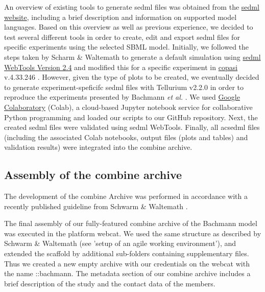An overview of existing tools to generate \ac{sedml} files was obtained from the \hyperlink{http://sed-ml.org/}{\acs{sedml} website}, including a brief description and information on supported model languages. Based on this overview as well as previous experience, we decided to test several different tools in order to create, edit and export \ac{sedml} files for specific experiments using the selected SBML model. 
Initially, we followed the steps taken by Scharm \& Waltemath \cite{combine} to generate a default simulation using \hyperlink{http://sysbioapps.spdns.org/SED-ML_Web_Tools}{\acs{sedml} WebTools Version 2.4} and modified this for a specific experiment in \hyperlink{http://copasi.org/}{\ac{copasi}} v.4.33.246 \cite{copasi}. However, given the type of plots to be created, we eventually decided to generate experiment-speficifc \ac{sedml} files with Tellurium v2.2.0 \cite{tellurium} in order to reproduce the experiments presented by Bachmann \textit{et al.} \cite{bachmannmodel}. We used \hyperref[https://colab.research.google.com/notebooks/welcome.ipynb?hl=de]{Google Colaboratory} (Colab), a cloud-based Jupyter notebook service for collaborative Python programming and loaded our scripts to our GitHub repository. Next, the created \ac{sedml} files were validated using \ac{sedml} WebTools. Finally, all ac{sedml} files (including the associated Colab notebooks, output files (plots and tables) and validation results) were integrated into the \ac{combine} archive.

\subsection*{Assembly of the \acs{combine} archive}

The development of the \ac{combine} Archive was performed in accordance with a recently published guideline from Schwarm \& Waltemath \cite{combine}.

The final assembly of our fully-featured \ac{combine} archive of the Bachmann model was executed in the platform \ac{webcat}. We used the same structure as described by Schwarm \& Waltemath (see 'setup of an agile working environment'), and extended the scaffold by additional sub-folders containing supplementary files. Thus we created a new empty archive with our credentials on the \ac{webcat} with the name \textsf{::bachmann}. The metadata section of our \ac{combine} archive includes a brief description of the study and the contact data of the members.

